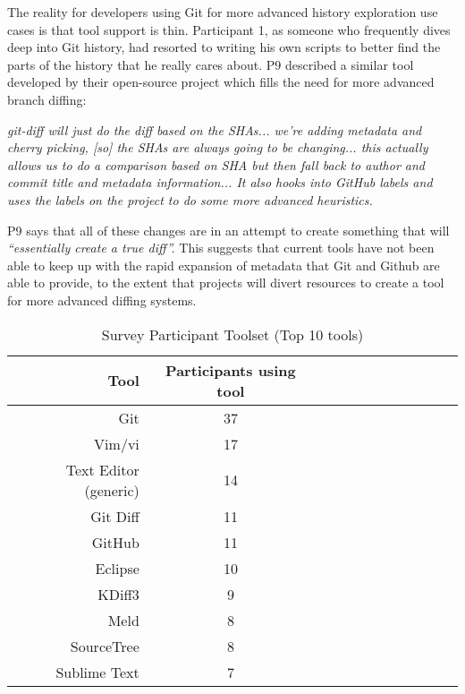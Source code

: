 The reality for developers using Git for more advanced history exploration use cases is that tool support is thin. Participant 1, as someone who frequently dives deep into Git history, had resorted to writing his own scripts to better find the parts of the history that he really cares about. P9 described a similar tool developed by their open-source project which fills the need for more advanced branch diffing:
\begin{displayquote}
\textit{git-diff will just do the diff based on the SHAs... we're adding metadata and cherry picking, [so] the SHAs are always going to be changing... this actually allows us to do a comparison based on SHA but then fall back to author and commit title and metadata information... It also hooks into GitHub labels and uses the labels on the project to do some more advanced heuristics.}
\end{displayquote}

P9 says that all of these changes are in an attempt to create something that will \textit{``essentially create a true diff''.}
This suggests that current tools have not been able to keep up with the rapid expansion of metadata that Git and Github are able to provide, to the extent that projects will divert resources to create a tool for more advanced diffing systems. 

\begin{table}[!]
\renewcommand{\arraystretch}{1.3}
\caption{Survey Participant Toolset (Top 10 tools)}
\label{survey_toolset}
\centering
\begin{tabularx}{0.45\textwidth}{@{}r|*{10}{C}c@{}}
\toprule
Tool & Participants using tool\\
\midrule
Git	& 37\\
Vim/vi & 17\\
Text Editor (generic) & 14\\
Git Diff & 11\\
GitHub & 11\\
Eclipse & 10\\
KDiff3 & 9\\
Meld & 8\\
SourceTree & 8\\
Sublime Text & 7\\
\bottomrule
\end{tabularx}
\end{table}

